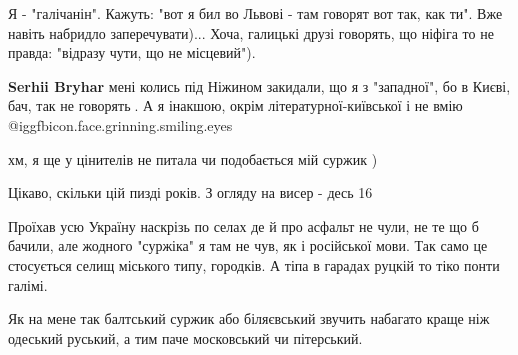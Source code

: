 Я - "галічанін". Кажуть: "вот я бил во Львові - там говорят вот так, как ти".
Вже навіть набридло заперечувати)... Хоча, галицькі друзі говорять, що ніфіга
то не правда: "відразу чути, що не місцевий").

\begin{itemize} %
 
\textbf{Serhii Bryhar} мені колись під Ніжином закидали, що я з "западної", бо в Києві, бач, так не говорять🤪. А я інакшою, окрім літературної-київської і не вмію  @igg{fbicon.face.grinning.smiling.eyes} 
\end{itemize} %

 
хм, я ще у цінителів не питала чи подобається мій суржик )

 
Цікаво, скільки цій пизді років. З огляду на висер - десь 16

 

Проїхав усю Україну наскрізь по селах де й про асфальт не чули, не те що б
бачили, але жодного "суржіка" я там не чув, як і російської мови. Так само це
стосується селищ міського типу, городків. А тіпа в гарадах руцкій то тіко понти
галімі.


 

Як на мене так балтський суржик або біляєвський звучить набагато краще ніж
одеський руський, а тим паче московський чи пітерський.


